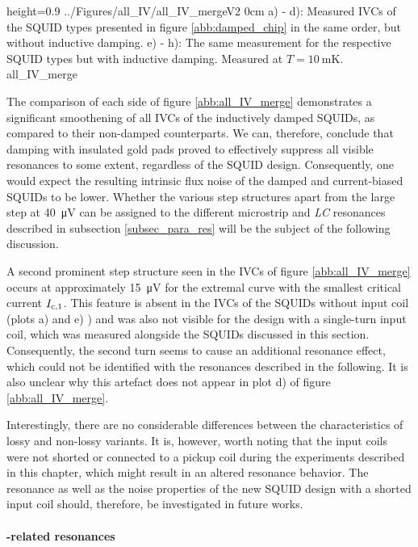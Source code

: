 {height=0.9\textheight}
{../Figures/all_IV/all_IV_mergeV2}
{0cm}
{a) - d): Measured IVCs of the SQUID types presented in figure \ref{abb:damped_chip} in the same order, but without inductive damping. e) - h): The same measurement for the respective SQUID types but with inductive damping. Measured at $T=\qty{10}{\milli\kelvin}$.} 
{all_IV_merge}

The comparison of each side of figure \ref{abb:all_IV_merge} demonstrates a significant smoothening of all IVCs of the inductively damped SQUIDs, as compared to their non-damped counterparts. We can, therefore, conclude that damping with insulated gold pads proved to effectively suppress all visible resonances to some extent, regardless of the SQUID design. Consequently, one would expect the resulting intrinsic flux noise of the damped and current-biased SQUIDs to be lower. %
Whether the various step structures apart from the large step at \qty{40}{\uV} can be assigned to the different microstrip and \textit{LC} resonances described in subsection \ref{subsec_para_res} will be the subject of the following discussion.

A second prominent step structure seen in the IVCs of figure \ref{abb:all_IV_merge} occurs at approximately \qty{15}{\uV} for the extremal curve with the smallest critical current $I_{\rm c,1}$. This feature is absent in the IVCs of the SQUIDs without input coil (plots a) and e) ) and was also not visible for the design with a single-turn input coil, which was measured alongside the SQUIDs discussed in this section. Consequently, the second turn seems to cause an additional resonance effect, which could not be identified with the resonances described in the following. It is also unclear why this artefact does not appear in plot d) of figure \ref{abb:all_IV_merge}. 

Interestingly, there are no considerable differences between the characteristics of lossy and non-lossy variants. It is, however, worth noting that the input coils were not shorted or connected to a pickup coil during the experiments described in this chapter, which might result in an altered resonance behavior. The resonance as well as the noise properties of the new SQUID design with a shorted input coil should, therefore, be investigated in future works.

\paragraph{-related resonances}


